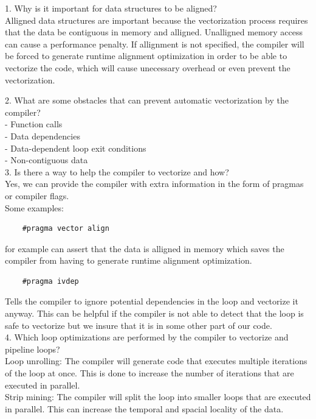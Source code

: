 \documentclass[unicode,11pt,a4paper,oneside,numbers=endperiod,openany]{scrartcl}
\begin{document}
1. Why is it important for data structures to be aligned? \\

Alligned data structures are important because the vectorization process requires that the data be contiguous in memory and alligned. 
Unalligned memory access can cause a performance penalty. 
If allignment is not specified, the compiler will be forced to generate runtime alignment optimization in order to be able to vectorize the code,
which will cause unecessary overhead or even prevent the vectorization.


2. What are some obstacles that can prevent automatic vectorization by the compiler? \\

- Function calls \\
- Data dependencies \\
- Data-dependent loop exit conditions \\
- Non-contiguous data \\

3. Is there a way to help the compiler to vectorize and how? \\

Yes, we can provide the compiler with extra information in the form of pragmas or compiler flags. \\

Some examples:
\begin{verbatim}
    #pragma vector align
\end{verbatim}
for example can assert that the data is alligned in memory which saves the compiler from having to generate runtime alignment optimization.
\begin{verbatim}
    #pragma ivdep
\end{verbatim}
Tells the compiler to ignore potential dependencies in the loop and vectorize it anyway. 
This can be helpful if the compiler is not able to detect that the loop is safe to vectorize but we insure that it is in some other part of our code.\\

4. Which loop optimizations are performed by the compiler to vectorize and pipeline loops?\\
Loop unrolling: The compiler will generate code that executes multiple iterations of the loop at once. 
This is done to increase the number of iterations that are executed in parallel. \\
Strip mining: The compiler will split the loop into smaller loops that are executed in parallel. 
This can increase the temporal and spacial locality of the data. \\
\end{document}
